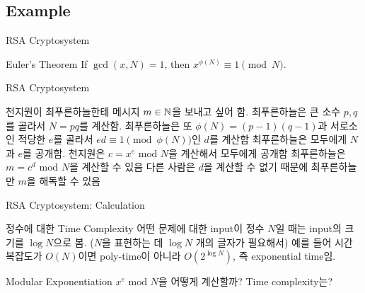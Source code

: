 \documentclass[../240513_msquare_shor.tex]{subfiles}
\begin{document}
\subsection{Example}

\begin{frame}{RSA Cryptosystem}
    \begin{exampleblock}{Euler's Theorem}
        If \(\gcd(x, N) = 1\), then \(x^{\phi(N)} \equiv 1 \pmod{N}\).
    \end{exampleblock}
    \pause
    \begin{block}{RSA Cryptosystem}
        \begin{enumerate}
            \ii
            천지원이 최푸른하늘한테 메시지 \(m \in \mathbb{N}\)을 보내고 싶어 함.
            \ii
            최푸른하늘은 큰 소수 \(p, q\)를 골라서 \(N = pq\)를 계산함.
            \ii
            최푸른하늘은 또 \(\phi(N) = (p-1)(q-1)\)과 서로소인 적당한 \(e\)를 골라서
            \(ed \equiv 1 \pmod{\phi(N)}\)인 \(d\)를 계산함
            \ii
            최푸른하늘은 모두에게 \(N\)과 \(e\)를 공개함.
            \ii
            천지원은 \(c = x^e \text{ mod }N\)을 계산해서 모두에게 공개함
            \ii
            최푸른하늘은 \(m = c^d \text{ mod }N\)을 계산할 수 있음
            \ii
            \alert{다른 사람은 \(d\)을 계산할 수 없기 때문에 최푸른하늘만 \(m\)을 해독할 수 있음}
        \end{enumerate}
    \end{block}
\end{frame}

\begin{frame}{RSA Cryptosystem: Calculation}
    \begin{alertblock}{정수에 대한 Time Complexity}
        어떤 문제에 대한 input이 정수 \(N\)일 때는 input의 크기를 \(\log N\)으로 봄.
        (\(N\)을 표현하는 데 \(\log N\) 개의 글자가 필요해서)
        예를 들어 시간 복잡도가 \(O(N)\)이면 poly-time이 아니라 \(O(2^{\log N})\), 즉 exponential time임.
    \end{alertblock}
    \pause
    \begin{block}{Modular Exponentiation}
        \(x^e \text{ mod } N\)을 어떻게 계산할까? Time complexity는?
    \end{block}
\end{frame}
\end{document}
